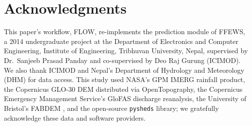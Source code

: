 \documentclass[11pt]{article}
\begin{document}
\section*{Acknowledgments}

This paper's workflow, FLOW, re-implements the prediction module of FFEWS, a 2014 undergraduate project at the Department of Electronics and Computer Engineering, Institute of Engineering, Tribhuvan University, Nepal, supervised by Dr.\ Sanjeeb Prasad Panday and co-supervised by Deo Raj Gurung (ICIMOD). We also thank ICIMOD and Nepal's Department of Hydrology and Meteorology (DHM) for data access. This study used NASA's GPM IMERG rainfall product, the Copernicus GLO-30 DEM distributed via OpenTopography, the Copernicus Emergency Management Service's GloFAS discharge reanalysis, the University of Bristol's FABDEM \citep{hawker2022fabdem}, and the open-source \texttt{pysheds} library; we gratefully acknowledge these data and software providers.


\end{document}
